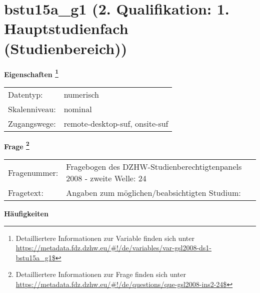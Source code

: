 
    \setcounter{footnote}{0}

    \vspace*{-1.8cm}
	\section{bstu15a\_g1 (2. Qualifikation: 1. Hauptstudienfach (Studienbereich))}
	\label{section:bstu15a_g1}



    \vspace*{0.5cm}
    \noindent\textbf{Eigenschaften
	\footnote{Detailliertere Informationen zur Variable finden sich unter
		\url{https://metadata.fdz.dzhw.eu/\#!/de/variables/var-gsl2008-ds1-bstu15a_g1$}}}\\
	\begin{tabularx}{\hsize}{@{}lX}
	Datentyp: & numerisch \\
	Skalenniveau: & nominal \\
	Zugangswege: &
	  remote-desktop-suf, 
	  onsite-suf
 \\
    \end{tabularx}



				\vspace*{0.5cm}
                \noindent\textbf{Frage
	                \footnote{Detailliertere Informationen zur Frage finden sich unter
		              \url{https://metadata.fdz.dzhw.eu/\#!/de/questions/que-gsl2008-ins2-24$}}}\\
				\begin{tabularx}{\hsize}{@{}lX}
					Fragenummer: &
					  Fragebogen des DZHW-Studienberechtigtenpanels 2008 - zweite Welle:
					  24
 \\
					Fragetext: & Angaben zum möglichen/beabsichtigten Studium: \\
				\end{tabularx}





        		\vspace*{0.5cm}
                \noindent\textbf{Häufigkeiten}

